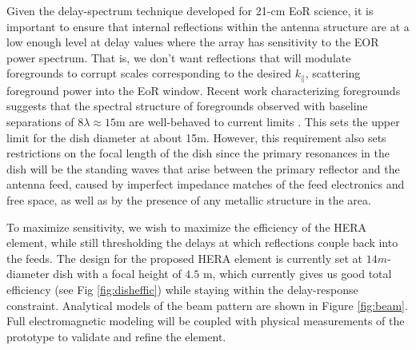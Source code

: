 \documentclass[preprint]{aastex}
\def\kpar{k_{\|}}
\begin{document}
Given the delay-spectrum technique developed for 21-cm EoR science, it is important 
to ensure that internal reflections within the antenna structure
are at a low enough level at delay values where the array has sensitivity to the EOR power spectrum.  
That is, we don't want reflections that will modulate foregrounds to corrupt scales corresponding to 
the desired $\kpar$, scattering foreground power into the EoR window.  Recent work characterizing 
foregrounds suggests that the spectral structure of foregrounds observed with
baseline separations of $8\lambda \approx 15$m are well-behaved to current limits \citep{parsons_et_al2013}. 
This sets the upper limit for the dish diameter at about
15m.  However, this requirement also sets restrictions on the focal length of
the dish since the primary resonances in the dish will be the standing waves
that arise between the primary reflector and the antenna feed, caused by
imperfect impedance matches of the feed electronics and free space, as well as by the presence of any 
metallic structure in the area.


%
%
%
To maximize sensitivity, we wish to maximize the efficiency of the
HERA element, while still thresholding the delays at which reflections couple
back into the feeds. The design for the proposed HERA element is currently set
at $14m$-diameter dish with a focal height of $4.5$ m, which currently gives us
good total efficiency (see Fig \ref{fig:disheffic}) while staying within the delay-response constraint. 
Analytical models of the beam pattern are shown in Figure \ref{fig:beam}.
Full electromagnetic modeling will be coupled with 
physical measurements of the prototype to validate and refine the element.
\end{document}
